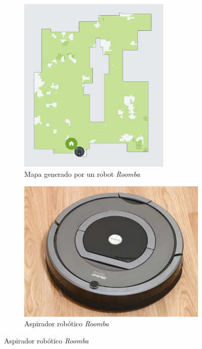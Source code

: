 \begin{itemize}
   \begin{figure}[H]
    \centering
        \begin{subfigure}{0.45\textwidth}           \includegraphics[width=0.8\textwidth]{img/roomba.png}
        \caption{Mapa generado por un robot \textit{Roomba}} \label{fig:roomba}        \label{fig:roombamapa}
        \end{subfigure}
        \begin{subfigure}{0.45\textwidth}
            \includegraphics[width=\textwidth]{img/roomba.jpg}
            \caption{Aspirador robótico \textit{Roomba}} 
            \label{fig:roombarobot}
        \end{subfigure}
        \label{fig:roomba}
    \end{figure}


\end{itemize}
